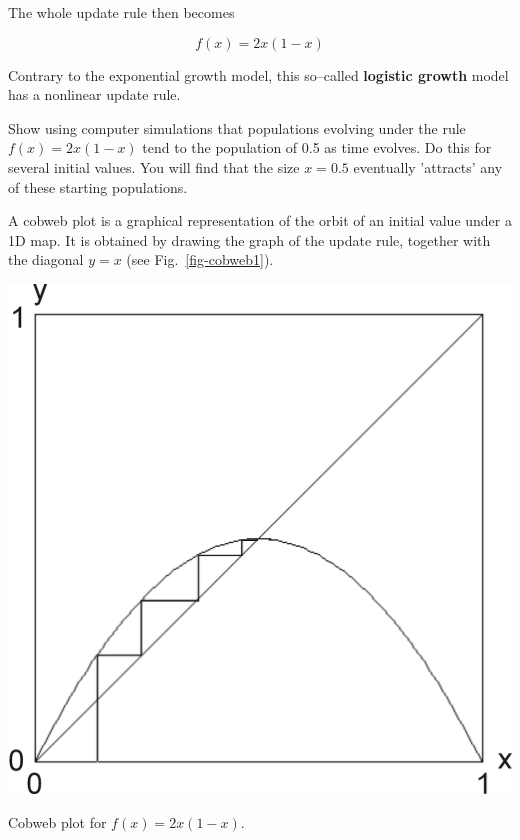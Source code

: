 The whole update rule then becomes

\begin{equation}
f(x) = 2 x (1-x) \label{eq-logistic-growth}
\end{equation} 

Contrary to the exponential growth model, this so--called \textbf{logistic growth} model has a nonlinear update rule.

\begin{exer}
Show using computer simulations that populations evolving under the rule $f(x) = 2 x (1-x)$ tend to the population of 0.5 as time evolves. Do this for several initial values. You will find that the size $x=0.5$ eventually 'attracts' any of these starting populations.
\end{exer}

\pagebreak


A cobweb plot is a graphical representation of the orbit of an initial value under a 1D map. It is obtained by drawing the graph of the update rule, together with the diagonal $y=x$ (see Fig.~\ref{fig-cobweb1}).

\begin{marginfigure}
\centering
\includegraphics{dynamic/figures/cobweb1}
\caption{Cobweb plot for $f(x)=2x(1-x)$.}
\label{fig-cobweb1}
\end{marginfigure} 

